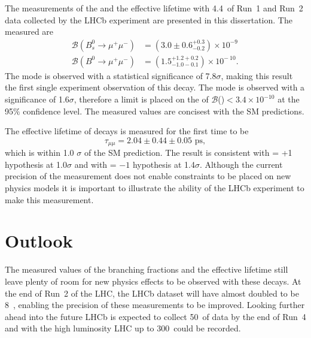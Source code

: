 The measurements of the \bmumu \BF and the \bsmumu effective lifetime with 4.4~\fb of Run~1 and Run~2 data collected by the LHCb experiment are presented in this dissertation. The measured \BFs are
\begin{equation}
\begin{split}
  \mathcal{B}(B^{0}_{s} \to \mu^{+} \mu^{-}) &= (3.0 \pm 0.6^{+0.3}_{-0.2}) \times 10^{-9\
} \\
  \mathcal{B}(B^{0} \to \mu^{+} \mu^{-}) &= (1.5^{+1.2 +0.2}_{-1.0 -0.1})    \times 10^{-\
10}.
\end{split}
\label{eq:BFresults2}
\end{equation}
The \bs mode is observed with a statistical significance of 7.8$\sigma$, making this result the first single experiment observation of this decay. The \bd mode is observed with a significance of 1.6$\sigma$, therefore a limit is placed on the \BF of $\mathcal{B}$(\bdmumu)$ < 3.4 \times 10^{-10}$ at the 95$\%$ confidence level. The measured values are concisest with the SM predictions. %


The effective lifetime of \bsmumu decays is measured for the first time to be 
\begin{equation}
\tau_{\mu\mu} = 2.04 \pm 0.44 \pm 0.05 \text{ ps},
\end{equation}
which is within 1.0 $\sigma$ of the SM prediction. The result is consistent with \ADG = +1 hypothesis at 1.0$\sigma$ and with \ADG = $-1$ hypothesis at 1.4$\sigma$. Although the current precision of the measurement does not enable constraints to be placed on new physics models it is important to illustrate the ability of the LHCb experiment to make this measurement.


\section{Outlook}
The measured values of the branching fractions and the effective lifetime still leave plenty of room for new physics effects to be observed with these decays. At the end of Run~2 of the LHC, the LHCb dataset will have almost doubled to be 8~\fb, enabling the precision of these measurements to be improved. Looking further ahead into the future LHCb is expected to collect 50~\fb of data by the end of Run~4 and with the high luminosity LHC up to 300~\fb could be recorded. 

